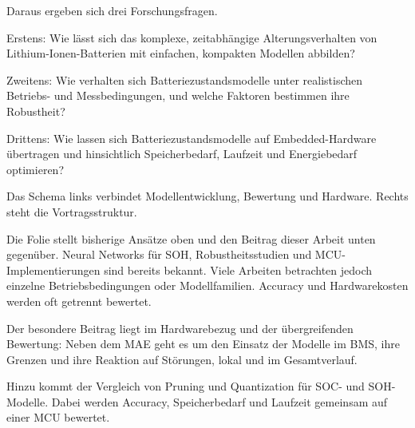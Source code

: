 
\begin{sprechtext}

Daraus ergeben sich drei Forschungsfragen.

Erstens: Wie lässt sich das komplexe, zeitabhängige Alterungsverhalten von Lithium-Ionen-Batterien mit einfachen, kompakten Modellen abbilden?

Zweitens: Wie verhalten sich Batteriezustandsmodelle unter realistischen Betriebs- und Messbedingungen, und welche Faktoren bestimmen ihre Robustheit?

Drittens: Wie lassen sich Batteriezustandsmodelle auf Embedded-Hardware übertragen und hinsichtlich Speicherbedarf, Laufzeit und Energiebedarf optimieren?

Das Schema links verbindet Modellentwicklung, Bewertung und Hardware. Rechts steht die Vortragsstruktur.

\end{sprechtext}


\begin{sprechtext}

Die Folie stellt bisherige Ansätze oben und den Beitrag dieser Arbeit unten gegenüber. Neural Networks für SOH, Robustheitsstudien und MCU-Implementierungen sind bereits bekannt. Viele Arbeiten betrachten jedoch einzelne Betriebsbedingungen oder Modellfamilien. Accuracy und Hardwarekosten werden oft getrennt bewertet.

Der besondere Beitrag liegt im Hardwarebezug und der übergreifenden Bewertung: Neben dem MAE geht es um den Einsatz der Modelle im BMS, ihre Grenzen und ihre Reaktion auf Störungen, lokal und im Gesamtverlauf.

Hinzu kommt der Vergleich von Pruning und Quantization für SOC- und SOH-Modelle. Dabei werden Accuracy, Speicherbedarf und Laufzeit gemeinsam auf einer MCU bewertet.

\end{sprechtext}


